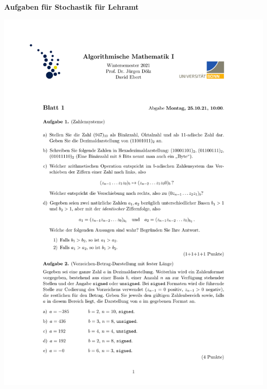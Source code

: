 \documentclass[a4paper,oneside,11pt]{scrartcl}
\begin{document}

\begin{center}
{\Large{\textbf{Aufgaben für Stochastik für Lehramt}}} \\
\end{center}

\begin{minipage}[t]{\textwidth}
\includegraphics[scale = 0.75, page=3]{AlMa_blatt01.pdf}
\end{minipage}
\pagebreak
\end{document}
